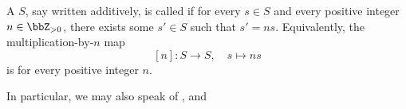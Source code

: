 \begin{definition} \label{definition:divisible_commutative_semigroup_divisible_commutative_monoid_divisible_abelian_group}
    A  $S$, say written additively, is called  if for every $s \in S$ and every positive integer $n \in \bbZ_{>0}$, there exists some $s' \in S$ such that $s' = ns$.
    Equivalently, the multiplication-by-$n$ map
    $$[n] : S \longrightarrow S, \quad s \longmapsto ns$$
    is  for every positive integer $n$.

    In particular, we may also speak of , and 

\end{definition}

